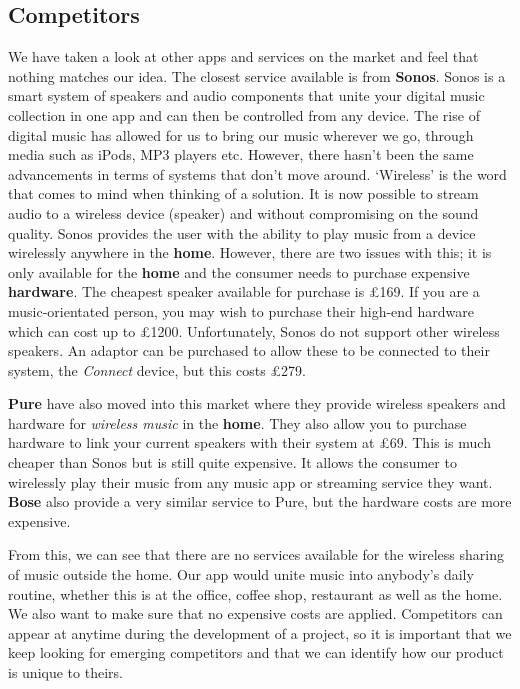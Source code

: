 \subsection{Competitors}
We have taken a look at other apps and services on the market and feel that nothing matches our idea. The closest service available is from \textbf{Sonos}. Sonos is a smart system of speakers and audio components that unite your digital music collection in one app and can then be controlled from any device. The rise of digital music has allowed for us to bring our music wherever we go, through media such as iPods, MP3 players etc. However, there hasn't been the same advancements in terms of systems that don't move around. `Wireless' is the word that comes to mind when thinking of a solution. It is now possible to stream audio to a wireless device (speaker) and without compromising on the sound quality. Sonos provides the user with the ability to play music from a device wirelessly anywhere in the \textbf{home}. However, there are two issues with this; it is only available for the \textbf{home} and the consumer needs to purchase expensive \textbf{hardware}. The cheapest speaker available for purchase is \pounds169. If you are a music-orientated person, you may wish to purchase their high-end hardware which can cost up to \pounds1200. Unfortunately, Sonos do not support other wireless speakers. An adaptor can be purchased to allow these to be connected to their system, the \emph{Connect} device, but this costs \pounds279.  

\textbf{Pure} have also moved into this market where they provide wireless speakers and hardware for \emph{wireless music} in the \textbf{home}. They also allow you to purchase hardware to link your current speakers with their system at \pounds69.  This is much cheaper than Sonos but is still quite expensive. It allows the consumer to wirelessly play their music from any music app or streaming service they want. \textbf{Bose} also provide a very similar service to Pure, but the hardware costs are more expensive.

From this, we can see that there are no services available for the wireless sharing of music outside the home. Our app would unite music into anybody's daily routine, whether this is at the office, coffee shop, restaurant as well as the home. We also want to make sure that no expensive costs are applied.
Competitors can appear at anytime during the development of a project, so it is important that we keep looking for emerging competitors and that we can identify how our product is unique to theirs. 

